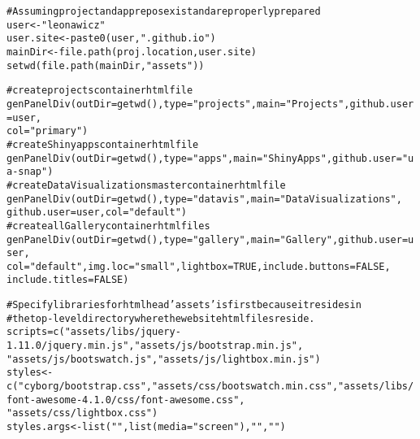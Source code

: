 \documentclass{article}\usepackage[]{graphicx}\usepackage[]{color}
\makeatletter
\newcommand{\hlnum}[1]{\textcolor[rgb]{0.863,0.196,0.184}{#1}}%
\newcommand{\hlstr}[1]{\textcolor[rgb]{0.863,0.196,0.184}{#1}}%
\newcommand{\hlcom}[1]{\textcolor[rgb]{0.345,0.431,0.459}{#1}}%
\newcommand{\hlstd}[1]{\textcolor[rgb]{0.514,0.58,0.588}{#1}}%
\newcommand{\hlkwb}[1]{\textcolor[rgb]{0.522,0.6,0}{#1}}%
\newcommand{\hlkwc}[1]{\textcolor[rgb]{0.796,0.294,0.086}{#1}}%
\newcommand{\hlkwd}[1]{\textcolor[rgb]{0.576,0.631,0.631}{#1}}%
\newenvironment{kframe}{%
 \def\at@end@of@kframe{}%
 \ifinner\ifhmode%
  \def\at@end@of@kframe{\end{minipage}}%
  \begin{minipage}{\columnwidth}%
 \fi\fi%
 \def\FrameCommand##1{\hskip\@totalleftmargin \hskip-\fboxsep
 \colorbox{shadecolor}{##1}\hskip-\fboxsep
     \hskip-\linewidth \hskip-\@totalleftmargin \hskip\columnwidth}%
 \MakeFramed {\advance\hsize-\width
   \@totalleftmargin\z@ \linewidth\hsize
   \@setminipage}}%
 {\par\unskip\endMakeFramed%
 \at@end@of@kframe}
\newenvironment{knitrout}{}{} %
\makeatother
\begin{document}
\begin{knitrout}
\color{fgcolor}\begin{kframe}
\begin{alltt}
\hlcom{# Assuming project and app repos exist and are properly prepared}
\hlstd{user} \hlkwb{<-} \hlstr{"leonawicz"}
\hlstd{user.site} \hlkwb{<-} \hlkwd{paste0}\hlstd{(user,} \hlstr{".github.io"}\hlstd{)}
\hlstd{mainDir} \hlkwb{<-} \hlkwd{file.path}\hlstd{(proj.location, user.site)}
\hlkwd{setwd}\hlstd{(}\hlkwd{file.path}\hlstd{(mainDir,} \hlstr{"assets"}\hlstd{))}

\hlcom{# create projects container html file}
\hlkwd{genPanelDiv}\hlstd{(}\hlkwc{outDir} \hlstd{=} \hlkwd{getwd}\hlstd{(),} \hlkwc{type} \hlstd{=} \hlstr{"projects"}\hlstd{,} \hlkwc{main} \hlstd{=} \hlstr{"Projects"}\hlstd{,} \hlkwc{github.user} \hlstd{= user,}
    \hlkwc{col} \hlstd{=} \hlstr{"primary"}\hlstd{)}
\hlcom{# create Shiny apps container html file}
\hlkwd{genPanelDiv}\hlstd{(}\hlkwc{outDir} \hlstd{=} \hlkwd{getwd}\hlstd{(),} \hlkwc{type} \hlstd{=} \hlstr{"apps"}\hlstd{,} \hlkwc{main} \hlstd{=} \hlstr{"Shiny Apps"}\hlstd{,} \hlkwc{github.user} \hlstd{=} \hlstr{"ua-snap"}\hlstd{)}
\hlcom{# create Data Visualizations master container html file}
\hlkwd{genPanelDiv}\hlstd{(}\hlkwc{outDir} \hlstd{=} \hlkwd{getwd}\hlstd{(),} \hlkwc{type} \hlstd{=} \hlstr{"datavis"}\hlstd{,} \hlkwc{main} \hlstd{=} \hlstr{"Data Visualizations"}\hlstd{,}
    \hlkwc{github.user} \hlstd{= user,} \hlkwc{col} \hlstd{=} \hlstr{"default"}\hlstd{)}
\hlcom{# create all Gallery container html files}
\hlkwd{genPanelDiv}\hlstd{(}\hlkwc{outDir} \hlstd{=} \hlkwd{getwd}\hlstd{(),} \hlkwc{type} \hlstd{=} \hlstr{"gallery"}\hlstd{,} \hlkwc{main} \hlstd{=} \hlstr{"Gallery"}\hlstd{,} \hlkwc{github.user} \hlstd{= user,}
    \hlkwc{col} \hlstd{=} \hlstr{"default"}\hlstd{,} \hlkwc{img.loc} \hlstd{=} \hlstr{"small"}\hlstd{,} \hlkwc{lightbox} \hlstd{=} \hlnum{TRUE}\hlstd{,} \hlkwc{include.buttons} \hlstd{=} \hlnum{FALSE}\hlstd{,}
    \hlkwc{include.titles} \hlstd{=} \hlnum{FALSE}\hlstd{)}

\hlcom{# Specify libraries for html head 'assets' is first because it resides in}
\hlcom{# the top-level directory where the web site html files reside.}
\hlstd{scripts} \hlkwb{=} \hlkwd{c}\hlstd{(}\hlstr{"assets/libs/jquery-1.11.0/jquery.min.js"}\hlstd{,} \hlstr{"assets/js/bootstrap.min.js"}\hlstd{,}
    \hlstr{"assets/js/bootswatch.js"}\hlstd{,} \hlstr{"assets/js/lightbox.min.js"}\hlstd{)}
\hlstd{styles} \hlkwb{<-} \hlkwd{c}\hlstd{(}\hlstr{"cyborg/bootstrap.css"}\hlstd{,} \hlstr{"assets/css/bootswatch.min.css"}\hlstd{,} \hlstr{"assets/libs/font-awesome-4.1.0/css/font-awesome.css"}\hlstd{,}
    \hlstr{"assets/css/lightbox.css"}\hlstd{)}
\hlstd{styles.args} \hlkwb{<-} \hlkwd{list}\hlstd{(}\hlstr{""}\hlstd{,} \hlkwd{list}\hlstd{(}\hlkwc{media} \hlstd{=} \hlstr{"screen"}\hlstd{),} \hlstr{""}\hlstd{,} \hlstr{""}\hlstd{)}


\end{alltt}
\end{kframe}
\end{knitrout}
\end{document}
